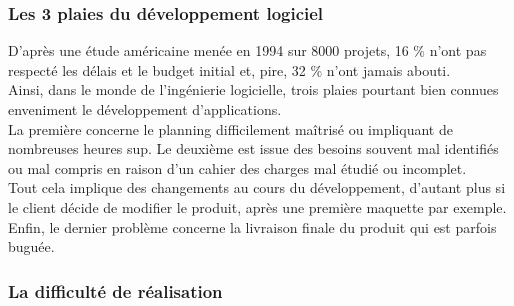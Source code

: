 \documentclass[]{article}
\begin{document}
\hypertarget{les-3-plaies-du-duxe9veloppement-logiciel}{%
\subsubsection{Les 3 plaies du développement
logiciel}\label{les-3-plaies-du-duxe9veloppement-logiciel}}

D'après une étude américaine menée en 1994 sur 8000 projets, 16 \% n'ont
pas respecté les délais et le budget initial et, pire, 32 \% n'ont
jamais abouti.\\
Ainsi, dans le monde de l'ingénierie logicielle, trois plaies pourtant
bien connues enveniment le développement d'applications.\\
La première concerne le planning difficilement maîtrisé ou impliquant de
nombreuses heures sup. Le deuxième est issue des besoins souvent mal
identifiés ou mal compris en raison d'un cahier des charges mal étudié
ou incomplet.~\\
Tout cela implique des changements au cours du développement, d'autant
plus si le client décide de modifier le produit, après une première
maquette par exemple. Enfin, le dernier problème concerne la livraison
finale du produit qui est parfois buguée.


\hypertarget{la-difficultuxe9-de-ruxe9alisation}{%
\subsubsection{La difficulté de
réalisation}\label{la-difficultuxe9-de-ruxe9alisation}}
\end{document}
